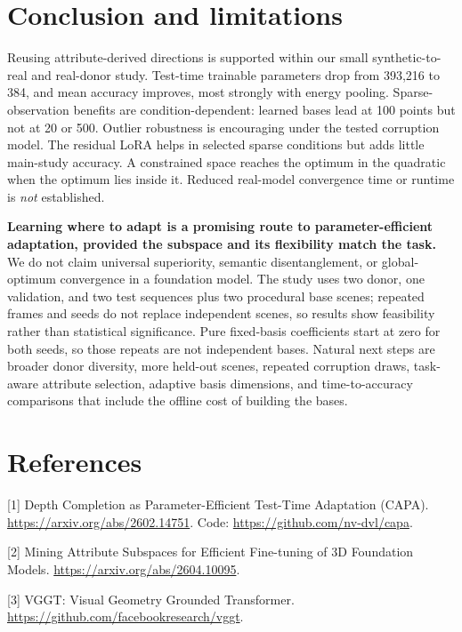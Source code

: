 \documentclass{article}
\begin{document}
\section{Conclusion and limitations}

Reusing attribute-derived directions is supported within our small synthetic-to-real and real-donor study. Test-time trainable parameters drop from 393,216 to 384, and mean accuracy improves, most strongly with energy pooling. Sparse-observation benefits are condition-dependent: learned bases lead at 100 points but not at 20 or 500. Outlier robustness is encouraging under the tested corruption model. The residual LoRA helps in selected sparse conditions but adds little main-study accuracy. A constrained space reaches the optimum in the quadratic when the optimum lies inside it. Reduced real-model convergence time or runtime is \emph{not} established.

\textbf{Learning where to adapt is a promising route to parameter-efficient adaptation, provided the subspace and its flexibility match the task.} We do not claim universal superiority, semantic disentanglement, or global-optimum convergence in a foundation model. The study uses two donor, one validation, and two test sequences plus two procedural base scenes; repeated frames and seeds do not replace independent scenes, so results show feasibility rather than statistical significance. Pure fixed-basis coefficients start at zero for both seeds, so those repeats are not independent bases. Natural next steps are broader donor diversity, more held-out scenes, repeated corruption draws, task-aware attribute selection, adaptive basis dimensions, and time-to-accuracy comparisons that include the offline cost of building the bases.

\section*{References}
{
\small

[1] Depth Completion as Parameter-Efficient Test-Time Adaptation (CAPA). \url{https://arxiv.org/abs/2602.14751}. Code: \url{https://github.com/nv-dvl/capa}.

[2] Mining Attribute Subspaces for Efficient Fine-tuning of 3D Foundation Models. \url{https://arxiv.org/abs/2604.10095}.

[3] VGGT: Visual Geometry Grounded Transformer. \url{https://github.com/facebookresearch/vggt}.
}
\end{document}
